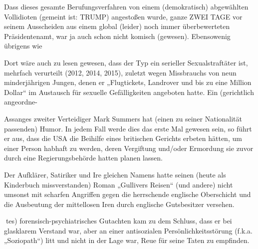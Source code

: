 \begin{multicols}{2}
Dass dieses gesamte Berufungsverfahren von einem
(demokratisch) abgewählten Vollidioten (gemeint ist:
TRUMP) angestoßen wurde, ganze ZWEI TAGE vor seinem Ausscheiden aus einem global (leider) noch immer
überbewerteten Präsidentenamt, war ja auch schon
nicht komisch (gewesen). Ebensowenig übrigens wie

Dort wäre auch zu lesen gewesen, dass der Typ ein serieller Sexualstraftäter ist, mehrfach verurteilt (2012, 2014,
2015), zuletzt wegen Missbrauchs von neun minderjährigen Jungen, denen er „Flugtickets, Landrover und bis
zu eine Million Dollar“ im Austausch für sexuelle Gefälligkeiten angeboten hatte. Ein (gerichtlich angeordne-

Assanges zweiter Verteidiger Mark Summers hat (einen
zu seiner Nationalität passenden) Humor. In jedem Fall
werde dies das erste Mal gewesen sein, so führt er aus,
dass die USA die Beihilfe eines britischen Gerichts erbeten hätten, um einer Person habhaft zu werden, deren
Vergiftung und/oder Ermordung sie zuvor durch eine
Regierungsbehörde hatten planen lassen.

Der Aufklärer, Satiriker und Ire gleichen Namens hatte seinen (heute als Kinderbuch missverstanden) Roman
„Gullivers Reisen“ (und andere) nicht umsonst mit scharfen Angriffen gegen die herrschende englische Oberschicht und die Ausbeutung der mittellosen Iren durch englische Gutsbesitzer versehen.


tes) forensisch-psychiatrisches Gutachten kam zu dem
Schluss, dass er bei glasklarem Verstand war, aber an
einer antisozialen Persönlichkeitsstörung (f.k.a. „Soziopath“) litt und nicht in der Lage war, Reue für seine Taten
zu empfinden.


\end{multicols}

